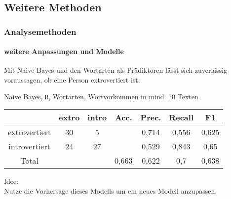 \subsection{Weitere Methoden}
\begin{frame}
 \frametitle{Analysemethoden}
 \framesubtitle{weitere Anpassungen und Modelle}
 Mit Naive Bayes und den Wortarten als Prädiktoren lässt sich zuverlässig voraussagen,
 ob eine Person extrovertiert ist:\\
 \vspace{12pt}
 \begin{center} 
 Naive Bayes, \texttt{R}, Wortarten, Wortvorkommen in mind. 10 Texten
  \begin{tabular}{c|c|c|c|c|c|c|}
                & extro & intro & Acc.  & Prec. & Recall    & F1 \\
  \hline
  extrovertiert & 30    & 5     &       & 0,714 & 0,556     & 0,625 \\
  introvertiert & 24    & 27    &       & 0,529 & 0,843     & 0,65 \\
  \hline
  Total         &       &       & 0,663 & 0,622 & 0,7       & 0,638 \\
  \hline
 \end{tabular}
 
 \end{center}

 \vspace{12pt}
 
 Idee:\\
 Nutze die Vorhersage dieses Modells um ein neues Modell anzupassen.
\end{frame}

